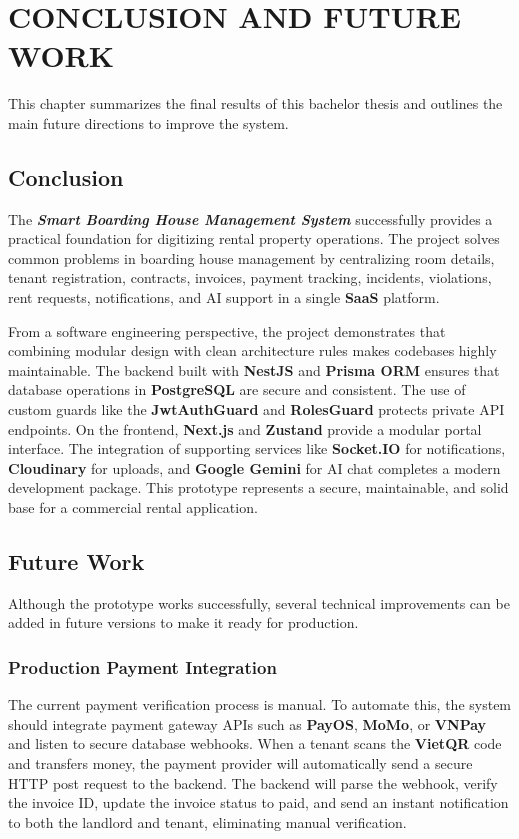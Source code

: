 \chapter{CONCLUSION AND FUTURE WORK}

This chapter summarizes the final results of this bachelor thesis and outlines the main future directions to improve the system.

\section{Conclusion}
The \textit{\textbf{Smart Boarding House Management System}} successfully provides a practical foundation for digitizing rental property operations. The project solves common problems in boarding house management by centralizing room details, tenant registration, contracts, invoices, payment tracking, incidents, violations, rent requests, notifications, and AI support in a single \textbf{SaaS} platform.

From a software engineering perspective, the project demonstrates that combining modular design with clean architecture rules makes codebases highly maintainable. The backend built with \textbf{NestJS} and \textbf{Prisma ORM} ensures that database operations in \textbf{PostgreSQL} are secure and consistent. The use of custom guards like the \textbf{JwtAuthGuard} and \textbf{RolesGuard} protects private API endpoints. On the frontend, \textbf{Next.js} and \textbf{Zustand} provide a modular portal interface. The integration of supporting services like \textbf{Socket.IO} for notifications, \textbf{Cloudinary} for uploads, and \textbf{Google Gemini} for AI chat completes a modern development package. This prototype represents a secure, maintainable, and solid base for a commercial rental application.

\section{Future Work}
Although the prototype works successfully, several technical improvements can be added in future versions to make it ready for production.

\subsection{Production Payment Integration}
The current payment verification process is manual. To automate this, the system should integrate payment gateway APIs such as \textbf{PayOS}, \textbf{MoMo}, or \textbf{VNPay} and listen to secure database webhooks. When a tenant scans the \textbf{VietQR} code and transfers money, the payment provider will automatically send a secure HTTP post request to the backend. The backend will parse the webhook, verify the invoice ID, update the invoice status to paid, and send an instant notification to both the landlord and tenant, eliminating manual verification.

